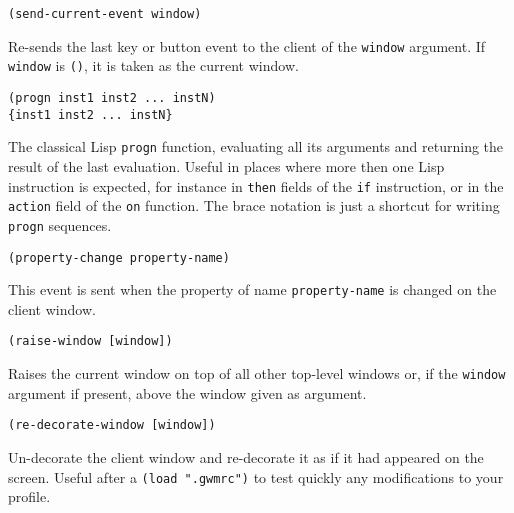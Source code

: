 
{\usagefont\begin{verbatim}
(send-current-event window)
\end{verbatim}}\usageupspace

Re-sends the last key or button event to the client of the \verb"window"
argument. If \verb"window" is \verb"()", it is taken as the current window.

        
{\usagefont\begin{verbatim}
(progn inst1 inst2 ... instN)
{inst1 inst2 ... instN}
\end{verbatim}}\usageupspace

The classical Lisp \verb"progn" function, evaluating all its arguments and
returning the result of the last evaluation. Useful in places where
more then one Lisp instruction is expected, for instance in
\verb"then" fields of the \verb"if" instruction, or in the
\verb"action" field of the \verb"on" function. The brace notation is
just a shortcut for writing \verb"progn" sequences.

        
{\usagefont\begin{verbatim}
(property-change property-name)
\end{verbatim}}\usageupspace

This event is sent when the property of name \verb"property-name" is changed
on the client window.

        
{\usagefont\begin{verbatim}
(raise-window [window])
\end{verbatim}}\usageupspace

Raises  the current window on top of all other top-level windows or, if the
\verb"window" argument if present, above the window given as argument.

        
{\usagefont\begin{verbatim}
(re-decorate-window [window])
\end{verbatim}}\usageupspace

Un-decorate the client window and re-decorate it as if it had appeared on
the screen. Useful after a \verb|(load ".gwmrc")| to test quickly any
modifications to your profile.

